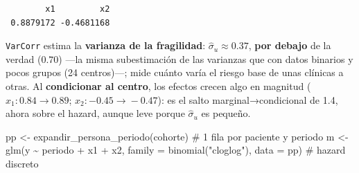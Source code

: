 \documentclass[
  letterpaper,
  DIV=11,
  numbers=noendperiod]{scrartcl}
\newenvironment{Shaded}{\begin{snugshade}}{\end{snugshade}}
\newcommand{\AttributeTok}[1]{\textcolor[rgb]{0.40,0.45,0.13}{#1}}
\newcommand{\CommentTok}[1]{\textcolor[rgb]{0.37,0.37,0.37}{#1}}
\newcommand{\FunctionTok}[1]{\textcolor[rgb]{0.28,0.35,0.67}{#1}}
\newcommand{\NormalTok}[1]{\textcolor[rgb]{0.00,0.23,0.31}{#1}}
\newcommand{\OtherTok}[1]{\textcolor[rgb]{0.00,0.23,0.31}{#1}}
\newcommand{\SpecialCharTok}[1]{\textcolor[rgb]{0.37,0.37,0.37}{#1}}
\newcommand{\StringTok}[1]{\textcolor[rgb]{0.13,0.47,0.30}{#1}}
\begin{document}
\begin{verbatim}
        x1         x2 
 0.8879172 -0.4681168 
\end{verbatim}

\texttt{VarCorr} estima la \textbf{varianza de la fragilidad}:
\(\hat\sigma_u\approx0.37\), \textbf{por debajo} de la verdad (\(0.70\))
---la misma subestimación de las varianzas que con datos binarios y
pocos grupos (24 centros)---; mide cuánto varía el riesgo base de unas
clínicas a otras. Al \textbf{condicionar al centro}, los efectos crecen
algo en magnitud (\(x_1: 0.84\!\to\!0.89\); \(x_2: -0.45\!\to\!-0.47\)):
es el salto marginal→condicional de 1.4, ahora sobre el hazard, aunque
leve porque \(\hat\sigma_u\) es pequeño.

\begin{tcolorbox}[enhanced jigsaw, coltitle=black, rightrule=.15mm, arc=.35mm, leftrule=.75mm, colback=white, colbacktitle=quarto-callout-tip-color!10!white, left=2mm, breakable, toptitle=1mm, toprule=.15mm, bottomtitle=1mm, titlerule=0mm, title=\textcolor{quarto-callout-tip-color}{\faLightbulb}\hspace{0.5em}{🔧 En R. El GLM de supervivencia en persona-periodo}, bottomrule=.15mm, opacityback=0, opacitybacktitle=0.6, colframe=quarto-callout-tip-color-frame]

\begin{Shaded}
\begin{Highlighting}[]
\NormalTok{pp }\OtherTok{\textless{}{-}} \FunctionTok{expandir\_persona\_periodo}\NormalTok{(cohorte)                                   }\CommentTok{\# 1 fila por paciente y periodo}
\NormalTok{m  }\OtherTok{\textless{}{-}} \FunctionTok{glm}\NormalTok{(y }\SpecialCharTok{\textasciitilde{}}\NormalTok{ periodo }\SpecialCharTok{+}\NormalTok{ x1 }\SpecialCharTok{+}\NormalTok{ x2, }\AttributeTok{family =} \FunctionTok{binomial}\NormalTok{(}\StringTok{"cloglog"}\NormalTok{), }\AttributeTok{data =}\NormalTok{ pp) }\CommentTok{\# hazard discreto}
\end{Highlighting}
\end{Shaded}


\end{tcolorbox}
\end{document}
